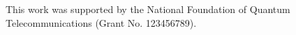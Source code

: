 \begin{ack}

This work was supported by the National Foundation of Quantum Telecommunications (Grant No. 123456789).

\end{ack}